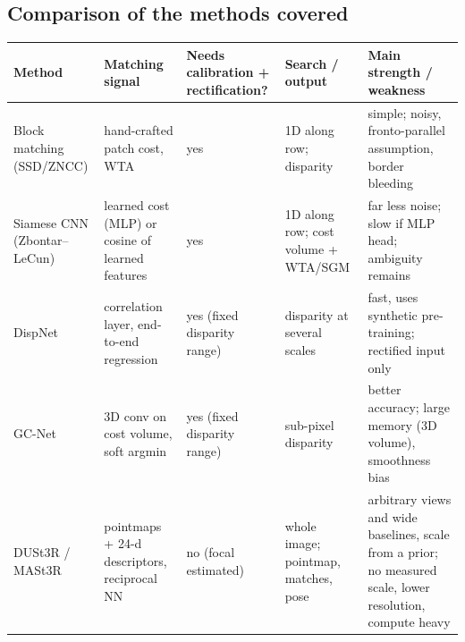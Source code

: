 \documentclass[11pt,a4paper]{article}
\theoremstyle{definition}
\begin{document}
\subsection*{Comparison of the methods covered}
\begin{center}\scriptsize
\renewcommand{\arraystretch}{1.25}
\setlength{\tabcolsep}{3pt}
\begin{tabular}{@{}>{\raggedright\arraybackslash}p{2.0cm}>{\raggedright\arraybackslash}p{2.7cm}>{\raggedright\arraybackslash}p{2.5cm}>{\raggedright\arraybackslash}p{2.5cm}>{\raggedright\arraybackslash}p{3.4cm}@{}}\toprule
\textbf{Method} & \textbf{Matching signal} & \textbf{Needs calibration + rectification?} & \textbf{Search / output} & \textbf{Main strength / weakness}\\\midrule
Block matching (SSD/ZNCC) & hand-crafted patch cost, WTA & yes & 1D along row; disparity & simple; noisy, fronto-parallel assumption, border bleeding\\
Siamese CNN (Zbontar--LeCun) & learned cost (MLP) or cosine of learned features & yes & 1D along row; cost volume + WTA/SGM & far less noise; slow if MLP head; ambiguity remains\\
DispNet & correlation layer, end-to-end regression & yes (fixed disparity range) & disparity at several scales & fast, uses synthetic pre-training; rectified input only\\
GC-Net & 3D conv on cost volume, soft argmin & yes (fixed disparity range) & sub-pixel disparity & better accuracy; large memory (3D volume), smoothness bias\\
DUSt3R / MASt3R & pointmaps + 24-d descriptors, reciprocal NN & no (focal estimated) & whole image; pointmap, matches, pose & arbitrary views and wide baselines, scale from a prior; no measured scale, lower resolution, compute heavy\\\bottomrule
\end{tabular}
\end{center}
\end{document}
